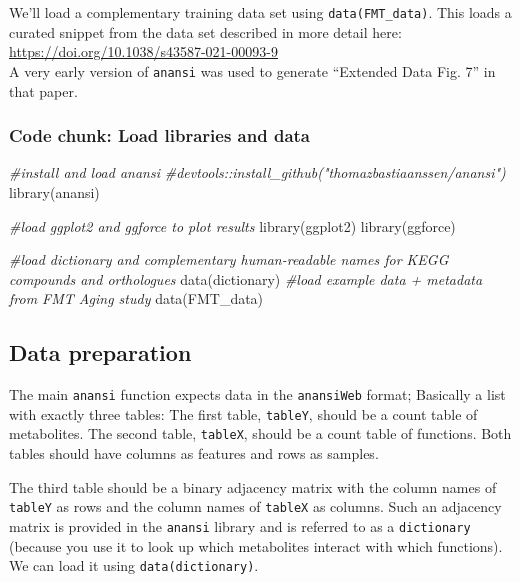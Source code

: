 \documentclass[
]{article}
\newenvironment{Shaded}{\begin{snugshade}}{\end{snugshade}}
\newcommand{\CommentTok}[1]{\textcolor[rgb]{0.56,0.35,0.01}{\textit{#1}}}
\newcommand{\FunctionTok}[1]{\textcolor[rgb]{0.00,0.00,0.00}{#1}}
\newcommand{\NormalTok}[1]{#1}
\begin{document}
We'll load a complementary training data set using
\texttt{data(FMT\_data)}. This loads a curated snippet from the data set
described in more detail here:
\url{https://doi.org/10.1038/s43587-021-00093-9}\\
A very early version of \texttt{anansi} was used to generate ``Extended
Data Fig. 7'' in that paper.

\hypertarget{code-chunk-load-libraries-and-data}{%
\subsubsection{Code chunk: Load libraries and
data}\label{code-chunk-load-libraries-and-data}}

\begin{Shaded}
\begin{Highlighting}[]
\CommentTok{\#install and load anansi}
\CommentTok{\#devtools::install\_github("thomazbastiaanssen/anansi")}
\FunctionTok{library}\NormalTok{(anansi)}

\CommentTok{\#load ggplot2 and ggforce to plot results}
\FunctionTok{library}\NormalTok{(ggplot2)}
\FunctionTok{library}\NormalTok{(ggforce)}

\CommentTok{\#load dictionary and complementary human{-}readable names for KEGG compounds and orthologues}
\FunctionTok{data}\NormalTok{(dictionary)}
\CommentTok{\#load example data + metadata from FMT Aging study}
\FunctionTok{data}\NormalTok{(FMT\_data)}
\end{Highlighting}
\end{Shaded}

\hypertarget{data-preparation}{%
\subsection{Data preparation}\label{data-preparation}}

The main \texttt{anansi} function expects data in the \texttt{anansiWeb}
format; Basically a list with exactly three tables: The first table,
\texttt{tableY}, should be a count table of metabolites. The second
table, \texttt{tableX}, should be a count table of functions. Both
tables should have columns as features and rows as samples.

The third table should be a binary adjacency matrix with the column
names of \texttt{tableY} as rows and the column names of \texttt{tableX}
as columns. Such an adjacency matrix is provided in the \texttt{anansi}
library and is referred to as a \texttt{dictionary} (because you use it
to look up which metabolites interact with which functions). We can load
it using \texttt{data(dictionary)}.
\end{document}
